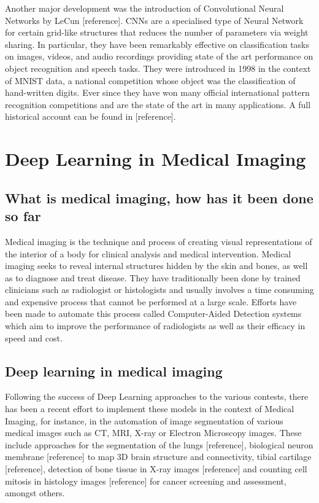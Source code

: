 Another major development was the introduction of Convolutional Neural Networks by LeCun [reference]. CNNs are a specialised type of Neural Network for certain grid-like structures that reduces the number of parameters via weight sharing. In particular, they have been remarkably effective on classification tasks on images, videos, and audio recordings providing state of the art performance on object recognition and speech tasks. They were introduced in 1998 in the context of MNIST data, a national competition whose object was the classification of hand-written digits. Ever since they have won many official international pattern recognition competitions and are the state of the art in many applications. A full historical account can be found in [reference].\\

\section{Deep Learning in Medical Imaging}

\subsection{What is medical imaging, how has it been done so far}

Medical imaging is the technique and process of creating visual representations of the interior of a body for clinical analysis and medical intervention. Medical imaging seeks to reveal internal structures hidden by the skin and bones, as well as to diagnose and treat disease. They have traditionally been done by trained clinicians such as radiologist or histologists and usually involves a time consuming and expensive process that cannot be performed at a large scale. Efforts have been made to automate this process called Computer-Aided Detection systems which aim to improve the performance of radiologists as well as their efficacy in speed and cost.

\subsection{Deep learning in medical imaging}

Following the success of Deep Learning approaches to the various contests, there has been a recent effort to implement these models in the context of Medical Imaging, for instance, in the automation of image segmentation of various medical images such as CT, MRI, X-ray or Electron Microscopy images. These include approaches for the segmentation of the lungs [reference], biological neuron membrane [reference] to map 3D brain structure and connectivity, tibial cartilage [reference], detection of bone tissue in X-ray images [reference] and counting cell mitosis in histology images [reference] for cancer screening and assessment, amongst others.\\

